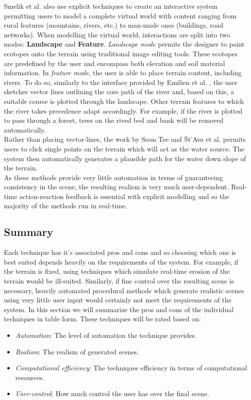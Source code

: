Smelik et al. also use explicit techniques to create an interactive system permitting users to model a complete virtual world with content ranging from rural features (mountains, rivers, etc.) to man-made ones (buildings, road networks). When modelling the virtual world, interactions are split into two modes: \textbf{Landscape} and \textbf{Feature}. \textit{Landscape mode} permits the designer to paint ecotopes onto the terrain using traditional image editing tools. These ecotopes are predefined by the user and encompass both elevation and soil material information. In \textit{feature mode}, the user is able to place terrain content, including rivers. To do so, similarly to the interface provided by Emilien et al. \cite{Emilien2014}, the user sketches vector lines outlining the core path of the river and, based on this, a suitable course is plotted through the landscape. Other terrain features to which the river takes precedence adapt accordingly. For example, if the river is plotted to pass through a forest, trees on the rived bed and bank will be removed automatically. \\

Rather than placing vector-lines, the work by Soon Tee \cite{Teoh2008} and Št'Ava et al. \cite{StAva2008} permits users to click single points on the terrain which will act as the water source. The system then automatically generates a plausible path for the water down slope of the terrain.\\

As these methods provide very little automation in terms of guaranteeing consistency in the scene, the resulting realism is very much user-dependent. Real-time action-reaction feedback is essential with explicit modelling and so the majority of the methods run in real-time.

\subsection{Summary} \label{Summary}

Each technique has it's associated pros and cons and so choosing which one is best suited depends heavily on the requirements of the system. For example, if the terrain is fixed, using techniques which simulate real-time erosion of the terrain would be ill-suited. Similarly, if fine control over the resulting scene is necessary, heavily automated procedural methods which generate realistic scenes using very little user input would certainly not meet the requirements of the system. In this section we will summarize the pros and cons of the individual techniques in table form. These techniques will be rated based on:
\begin{itemize}
\item \textit{Automation}: The level of automation the technique provides.
\item \textit{Realism}: The realism of generated scenes.
\item \textit{Computational efficiency}: The techniques efficiency in terms of computational resources.
\item \textit{User-control}: How much control the user has over the final scene. 
\end{itemize}

